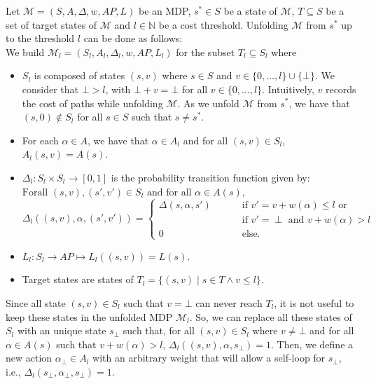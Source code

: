 \begin{definition} Let
  $\mathcal{M} = (S, A, \Delta, w, AP, L)$ be an MDP, $s^* \in S$ be a state of
  $\mathcal{M}$, $T \subseteq S$ be a set of target states of $\mathcal{M}$ and $l \in \mathbb{N}$ be a cost threshold.
  Unfolding $\mathcal{M}$ from $s^*$ up to the threshold $l$ can be done as follows: \\
  We build $\mathcal{M}_l = (S_l, A_l, \Delta_l, w, AP, L_l)$ for the subset $T_l \subseteq S_l$ where
  \begin{itemize}
  \item $S_l$ is composed of states $(s, v)$ where $s \in S$ and $v \in \{0, \dots, l\} \cup \{\bot\}$.
  We consider that $\bot > l$, with $\bot + v = \bot$ for all $v \in \{0, \dots, l\}$.
  Intuitively, $v$ records the cost of paths while unfolding $\mathcal{M}$.
  As we unfold $\mathcal{M}$ from $s^*$, we have that
  $(s, 0) \not \in S_l$ for all $s \in S$ such that $s \neq s^*$.
  \item For each $\alpha \in A$, we have that $\alpha \in A_l$ and for all $(s, v) \in S_l$, $A_l(s, v) = A(s)$.
  \item $\Delta_l: S_l \times S_l \rightarrow [0, 1]$ is the probability transition function given by:\\
  $\text{Forall } (s, v), (s', v') \in S_l \text{ and for all } \alpha \in A(s),$
  \[
  \Delta_l((s, v), \alpha, (s', v')) =
  \begin{cases}
  	\Delta(s, \alpha, s') & \quad \quad \text{ if } v' = v + w(\alpha) \leq l \text{ or}\\
  	 & \quad \quad \text{ if } v' = \perp \text{ and } v+w(\alpha) > l \\
  	0 & \quad \quad \text{ else}.
  \end{cases}
  \]
  \item $L_l:S_l \rightarrow AP \mapsto L_l((s, v)) = L(s)$.
  \item Target states are states of
  $T_l = \{(s, v) \;|\; s \in T \wedge v \leq l \}$.
  \end{itemize}
\end{definition}
\begin{remark}
  Since all state $(s, v) \in S_l$ such that $v = \bot$ can never reach $T_l$, it is not useful to keep these states in the unfolded MDP $\mathcal{M}_l$. So, we can replace all these states of $S_l$ with an unique state $s_\bot$ such that, for all $(s, v) \in S_l$ where $v \neq \bot$ and for all $\alpha \in A(s)$ such that $v + w(\alpha) > l$,
  $\Delta_l((s, v), \alpha, s_\bot) = 1$. Then, we define a new action $\alpha_\bot \in A_l$ with an arbitrary weight that will allow a self-loop for $s_\bot$, i.e., $\Delta_l(s_\bot, \alpha_\bot, s_\bot)=1$.
\end{remark}

